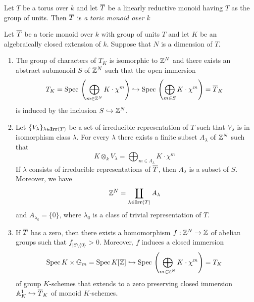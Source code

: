 \begin{definition}
Let $T$ be a torus over $k$ and let $\overline{T}$ be a linearly reductive monoid having $T$ as the group of units. Then $\overline{T}$ is \textit{a toric monoid over $k$}
\end{definition}

\begin{theorem}\label{theorem:toric_monoids_properties_Kempf_torus}
Let $\overline{T}$ be a toric monoid over $k$ with group of units $T$ and let $K$ be an algebraically closed extension of $k$. Suppose that $N$ is a dimension of $T$.
\begin{enumerate}[label=\emph{\textbf{(\arabic*)}}, leftmargin=1.5em]
\item The group of characters of $T_K$ is isomorphic to ${\mathbb Z}^N$ and there exists an abstract submonoid $S$ of ${\mathbb Z}^N$ such that the open immersion
$$T_K = \mathrm{Spec}\,\left(\bigoplus_{m\in {\mathbb Z}^N}K\cdot \chi^m\right) \hookrightarrow \mathrm{Spec}\,\left(\bigoplus_{m\in S}K\cdot \chi^m\right) = \overline{T}_K$$
is induced by the inclusion $S\hookrightarrow {\mathbb Z}^N$.
\item Let $\{V_{\lambda}\}_{\lambda\in \mathbf{Irr}(T)}$ be a set of irreducible representation of $T$ such that $V_{\lambda}$ is in isomorphism class $\lambda$. For every $\lambda$ there exists a finite subset $A_{\lambda}$ of ${\mathbb Z}^N$ such that
$$K\otimes_kV_{\lambda} = \bigoplus_{m\in A_{\lambda}}K\cdot \chi^m$$
If $\lambda$ consists of irreducible representations of $\overline{T}$, then $A_{\lambda}$ is a subset of $S$. Moreover, we have
$${\mathbb Z}^N = \coprod_{\lambda\in \mathbf{Irr}(T)}A_{\lambda}$$
and $A_{\lambda_0} = \{0\}$, where $\lambda_0$ is a class of trivial representation of $T$.
\item If $\overline{T}$ has a zero, then there exists a homomorphism $f:{\mathbb Z}^N\rightarrow {\mathbb Z}$ of abelian groups such that $f_{\mid S\setminus \{0\}}>0$. Moreover, $f$ induces a closed immersion
$$\mathrm{Spec}\, K\times \mathbb{G}_{m} = \mathrm{Spec}\, K[{\mathbb Z}]\hookrightarrow \mathrm{Spec}\, \left(\bigoplus_{m\in {\mathbb Z}^N}K\cdot \chi^m\right) = T_K$$
of group $K$-schemes that extends to a zero preserving closed immersion $\mathbb{A}^1_K\hookrightarrow \overline{T}_K$ of monoid $K$-schemes.
\end{enumerate}
\end{theorem}
